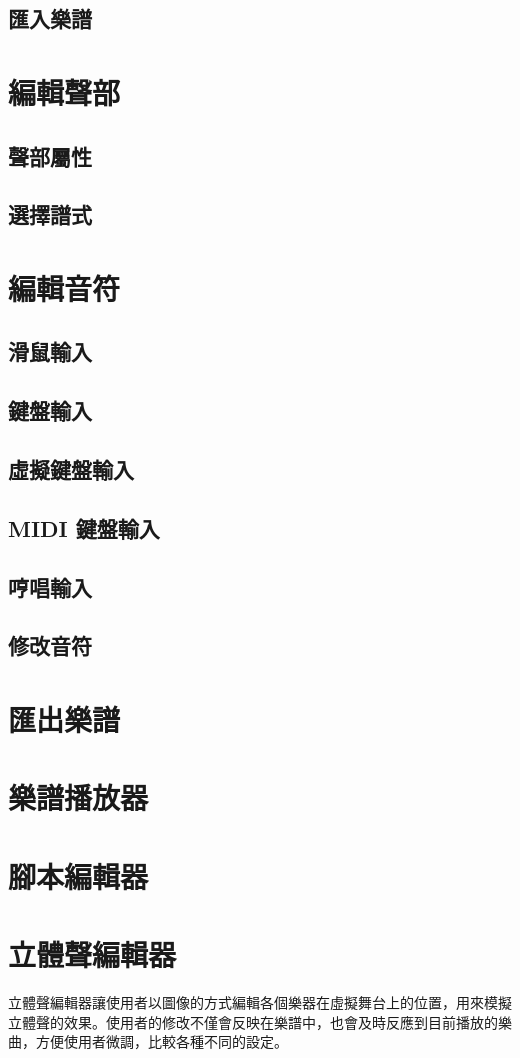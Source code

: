 \documentclass[12pt,a4paper,oneside]{report}
\begin{document}
   \subsection{匯入樂譜}
\section{編輯聲部}
   \subsection{聲部屬性}
   \subsection{選擇譜式}
\section{編輯音符}
   \subsection{滑鼠輸入}
   \subsection{鍵盤輸入}
   \subsection{虛擬鍵盤輸入}
   \subsection{MIDI 鍵盤輸入}
   \subsection{哼唱輸入}
   \subsection{修改音符}
\section{匯出樂譜}
\section{樂譜播放器}
\section{腳本編輯器}
\section{立體聲編輯器}
立體聲編輯器讓使用者以圖像的方式編輯各個樂器在虛擬舞台上的位置，用來模擬立體聲的效果。使用者的修改不僅會反映在樂譜中，也會及時反應到目前播放的樂曲，方便使用者微調，比較各種不同的設定。
\end{document}
